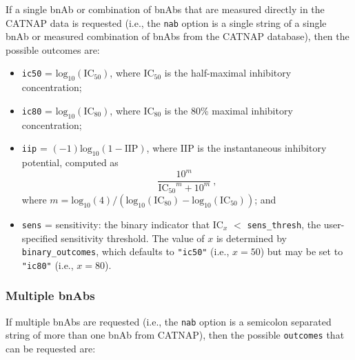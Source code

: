 \documentclass[]{article}
\providecommand{\tightlist}{%
  \setlength{\itemsep}{0pt}\setlength{\parskip}{0pt}}
\begin{document}
If a single bnAb or combination of bnAbs that are measured directly in
the CATNAP data is requested (i.e., the \texttt{nab} option is a single
string of a single bnAb or measured combination of bnAbs from the CATNAP
database), then the possible outcomes are:

\begin{itemize}
\tightlist
\item
  \texttt{ic50} = \(\mbox{log}_{10}(\mbox{IC}_{50})\), where IC\(_{50}\)
  is the half-maximal inhibitory concentration;
\item
  \texttt{ic80} = \(\mbox{log}_{10}(\mbox{IC}_{80})\), where IC\(_{80}\)
  is the 80\% maximal inhibitory concentration;
\item
  \texttt{iip} = \((-1)\mbox{log}_{10}(1 - \mbox{IIP})\), where IIP
  \citep[\citet{wagh2016optimal}]{shen2008dose} is the instantaneous
  inhibitory potential, computed as
  \[ \frac{10^m}{\mbox{IC$_{50}$}^m + 10^m} \ , \] where
  \(m = \mbox{log}_{10}(4) / (\mbox{log}_{10}(\mbox{IC}_{80}) - \mbox{log}_{10}(\mbox{IC}_{50}))\);
  and
\item
  \texttt{sens} = sensitivity: the binary indicator that IC\(_{x}\)
  \(<\) \texttt{sens\_thresh}, the user-specified sensitivity threshold.
  The value of \(x\) is determined by \texttt{binary\_outcomes}, which
  defaults to \texttt{"ic50"} (i.e., \(x = 50\)) but may be set to
  \texttt{"ic80"} (i.e., \(x = 80\)).
\end{itemize}

\subsubsection{Multiple bnAbs}\label{multiple-bnabs}

If multiple bnAbs are requested (i.e., the \texttt{nab} option is a
semicolon separated string of more than one bnAb from CATNAP), then the
possible \texttt{outcomes} that can be requested are:
\end{document}
